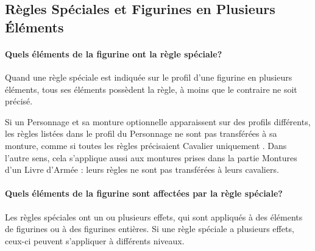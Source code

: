 \subsection{Règles Spéciales et Figurines en Plusieurs Éléments}

\paragraph{Quels éléments de la figurine ont la règle spéciale?}

Quand une règle spéciale est indiquée sur le profil d'une figurine en plusieurs éléments, tous ses éléments possèdent la règle, à moins que le contraire ne soit précisé.

Si un Personnage et sa monture optionnelle apparaissent sur des profils différents, les règles listées dans le profil du Personnage ne sont pas transférées à sa monture, comme si toutes les règles précisaient \og Cavalier uniquement \fg{}. Dans l'autre sens, cela s'applique aussi aux montures prises dans la partie Montures d'un Livre d'Armée : leurs règles ne sont pas transférées à leurs cavaliers.

\paragraph{Quels éléments de la figurine sont affectées par la règle spéciale?}

Les règles spéciales ont un ou plusieurs effets, qui sont appliqués à des éléments de figurines ou à des figurines entières. Si une règle spéciale a plusieurs effets, ceux-ci peuvent s'appliquer à différents niveaux.

